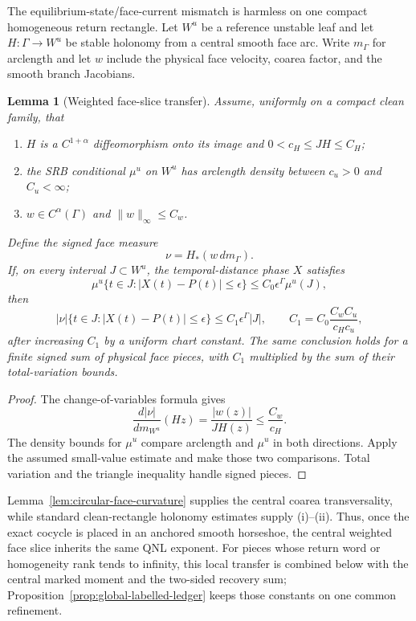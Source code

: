 \documentclass[11pt]{article}
\newtheorem{lemma}[theorem]{Lemma}
\begin{document}
The equilibrium-state/face-current mismatch is harmless on one compact
homogeneous return rectangle.  Let $W^u$ be a reference unstable leaf and let
$H:\Gamma\to W^u$ be stable holonomy from a central smooth face arc.  Write
$m_\Gamma$ for arclength and let $w$ include the physical face velocity,
coarea factor, and the smooth branch Jacobians.

\begin{lemma}[Weighted face-slice transfer]
\label{lem:weighted-face-qnl-transfer}
Assume, uniformly on a compact clean family, that
\begin{enumerate}[label=\textup{(\roman*)}]
\item $H$ is a $C^{1+\alpha}$ diffeomorphism onto its image and
      $0<c_H\le JH\le C_H$;
\item the SRB conditional $\mu^u$ on $W^u$ has arclength density between
      $c_u>0$ and $C_u<\infty$;
\item $w\in C^\alpha(\Gamma)$ and $\|w\|_\infty\le C_w$.
\end{enumerate}
Define the signed face measure
\[
 \nu=H_*(w\,dm_\Gamma).
\]
If, on every interval $J\subset W^u$, the temporal-distance phase $X$
satisfies
\[
 \mu^u\{t\in J:|X(t)-P(t)|\le\epsilon\}
 \le C_0\epsilon^\Gamma\mu^u(J),
\]
then
\[
 |\nu|\{t\in J:|X(t)-P(t)|\le\epsilon\}
 \le C_1\epsilon^\Gamma |J|,
 \qquad
 C_1=C_0\frac{C_wC_u}{c_Hc_u},
\]
after increasing $C_1$ by a uniform chart constant.  The same conclusion
holds for a finite signed sum of physical face pieces, with $C_1$ multiplied
by the sum of their total-variation bounds.
\end{lemma}

\begin{proof}
The change-of-variables formula gives
\[
 \frac{d|\nu|}{dm_{W^u}}(H z)
 =\frac{|w(z)|}{JH(z)}\le\frac{C_w}{c_H}.
\]
The density bounds for $\mu^u$ compare arclength and $\mu^u$ in both
directions.  Apply the assumed small-value estimate and make those two
comparisons.  Total variation and the triangle inequality handle signed
pieces.
\end{proof}

Lemma~\ref{lem:circular-face-curvature} supplies the central coarea
transversality, while standard clean-rectangle holonomy estimates supply
(i)--(ii).  Thus, once the exact cocycle is placed in an anchored smooth
horseshoe, the central weighted face slice inherits the same QNL exponent.
For pieces whose return word or homogeneity rank tends to infinity, this
local transfer is combined below with the central marked moment and the
two-sided recovery sum; Proposition~\ref{prop:global-labelled-ledger} keeps
those constants on one common refinement.
\end{document}
